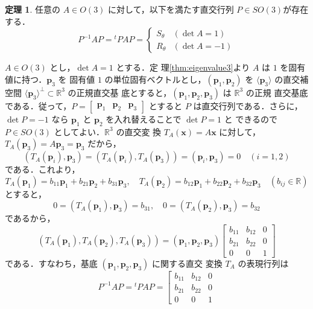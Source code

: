 \documentclass[11pt, uplatex, dvipdfmx, titlepage]{jsarticle}
\makeatletter
\renewenvironment{proof}[1][\proofname]{\par
  \pushQED{\qed}%
  \normalfont \topsep6\p@\@plus6\p@\relax
  \trivlist
  \item[\hskip\labelsep
         \bfseries
    {#1}]\ignorespaces
}{%
  \popQED\endtrivlist\@endpefalse
}
\theoremstyle{definition}
\newtheorem{theorem}{定理}[section]
\renewcommand{\proofname}{\textbf{証明}}
\makeatother
\begin{document}
\begin{theorem}\label{thm:stdform3}
  任意の $A \in O(3)$ に対して，以下を満たす直交行列 $P \in
  SO(3)$が存在する．
  \[
    P^{-1} A P = {}^{t}P A P = 
    \begin{cases}
      S_{\theta} & (\det A=1)\\
      R_{\theta} & (\det A=-1)
    \end{cases}
  \]
\end{theorem}

\begin{proof}
  $A \in O(3)$ とし，$\det A=1$ とする．定
  理\ref{thm:eigenvalue3}より $A$ は $1$ を固有値に持つ．$\bm{p}_3$ を
  固有値 $1$ の単位固有ベクトルとし，$(\bm{p}_1,
  \bm{p}_2)$ を $\langle \bm{p}_3 \rangle$ の直交補空間
  $\langle \bm{p}_3 \rangle^{\perp} \subset \mathbb{R}^3$ の正規直交基
  底とすると，$(\bm{p}_1, \bm{p}_2, \bm{p}_3)$ は $\mathbb{R}^3$ の正規
  直交基底である．従って，$P=\left[
    \begin{array}{ccc}
      \bm{p}_1 & \bm{p}_2 & \bm{p}_3
    \end{array}
  \right]$ とすると $P$ は直交行列である．さらに，$\det
  P=-1$ なら $\bm{p}_1$ と $\bm{p}_2$ を入れ替えることで $\det P=1$ と
  できるので $P \in SO(3)$ としてよい．$\mathbb{R}^3$ の直交変
  換 $T_A(\bm{x}) = A\bm{x}$ に対して，$T_A(\bm{p}_3) = A\bm{p}_3=
  \bm{p}_3$ だから，
  \[
    (T_A(\bm{p}_i), \bm{p}_3) = (T_A(\bm{p}_i), T_A(\bm{p}_3)) = (\bm{p}_i, \bm{p}_3) =0 \quad (i=1,2)
  \]
  である．これより，
  \[
    T_A(\bm{p}_1) = b_{11} \bm{p}_1 + b_{21} \bm{p}_2+ b_{31} \bm{p}_3, \quad 
    T_A(\bm{p}_2) = b_{12} \bm{p}_1 + b_{22} \bm{p}_2+ b_{32} \bm{p}_3 \quad (b_{ij} \in \mathbb{R})
  \]
  とすると，
  \[
    0 = (T_A(\bm{p}_1), \bm{p}_3) = b_{31}, \quad 0=(T_A(\bm{p}_2), \bm{p}_3) = b_{32}
  \]
  であるから，
  \[
    (T_A(\bm{p}_1), T_A(\bm{p}_2), T_A(\bm{p}_3)) = (\bm{p}_1, \bm{p}_2, \bm{p}_3) \left[
      \begin{array}{ccc}
        b_{11} & b_{12} & 0\\
        b_{21} & b_{22} & 0\\
        0 & 0 & 1
      \end{array}
    \right]
  \]
  である．すなわち，基底 $(\bm{p}_1, \bm{p}_2, \bm{p}_3)$ に関する直交
  変換 $T_A$ の表現行列は
  \[
    P^{-1}AP= {}^{t}PAP = \left[
      \begin{array}{ccc}
        b_{11} &  b_{12} & 0\\
        b_{21} & b_{22} & 0\\
        0 & 0 & 1
      \end{array}
\]
\end{proof}
\end{document}
